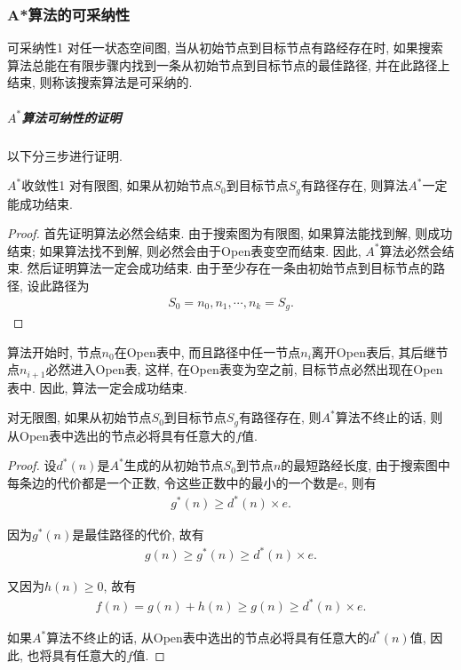 \subsubsection{A*算法的可采纳性}
\begin{mydef}{可采纳性}{1}
    对任一状态空间图, 当从初始节点到目标节点有路经存在时, 如果搜索算法总能在有限步骤内找到一条从初始节点到目标节点的最佳路径, 并在此路径上结束, 则称该搜索算法是可采纳的.
\end{mydef}
\subparagraph{$A^*$算法可纳性的证明}
以下分三步进行证明.
\begin{mythm}{$A^*$收敛性}{1}\label{Thm401}
    对有限图, 如果从初始节点$S_0$到目标节点$S_g$有路径存在, 则算法$A^*$一定能成功结束.
\end{mythm}
\begin{proof}
    首先证明算法必然会结束. 由于搜索图为有限图, 如果算法能找到解, 则成功结束; 如果算法找不到解, 则必然会由于Open表变空而结束. 因此, $A^*$算法必然会结束.
然后证明算法一定会成功结束. 由于至少存在一条由初始节点到目标节点的路径, 设此路径为
\begin{align}
    S_0=n_0, n_1, \cdots, n_k=S_g.
\end{align}
\end{proof}
算法开始时, 节点$n_0$在Open表中, 而且路径中任一节点$n_i$离开Open表后, 其后继节点$n_{i+1}$必然进入Open表, 这样, 在Open表变为空之前, 目标节点必然出现在Open表中. 因此, 算法一定会成功结束.
\begin{mylem}{}{}\label{AIlem001}
    对无限图, 如果从初始节点$S_0$到目标节点$S_g$有路径存在, 则$A^*$算法不终止的话, 则从Open表中选出的节点必将具有任意大的$f$值.
\end{mylem}
\begin{proof}
    设$d^*(n)$是$A^*$生成的从初始节点$S_0$到节点$n$的最短路经长度, 由于搜索图中每条边的代价都是一个正数, 令这些正数中的最小的一个数是$e$, 则有
\begin{align}
    g^*(n)\geq d^*(n)\times e.
\end{align}

因为$g^*(n)$是最佳路径的代价, 故有
\begin{align}
    g(n)\geq g^*(n)\geq d^*(n)\times e.
\end{align}

又因为$h(n)\geq 0$, 故有
\begin{align}
    f(n)=g(n)+h(n)\geq g(n)\geq d^*(n)\times e.
\end{align}

如果$A^*$算法不终止的话, 从Open表中选出的节点必将具有任意大的$d^*(n)$值, 因此, 也将具有任意大的$f$值.
\end{proof}
